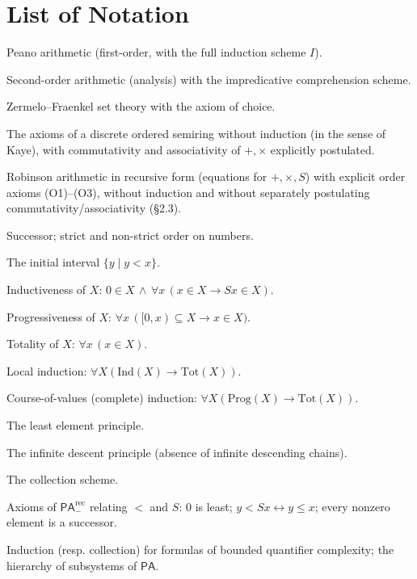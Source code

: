 \documentclass[12pt,a4paper]{article}
\theoremstyle{plain}
\theoremstyle{definition}
\newcommand{\toinf}{\rightarrow}
\newcommand{\PA}{\textsf{PA}}
\newcommand{\Ztwo}{\textsf{Z}_2}
\newcommand{\ZFC}{\textsf{ZFC}}
\newcommand{\PArec}{\PA^{\mathrm{rec}}_{-}}
\begin{document}
\section*{List of Notation}
\begin{description}[leftmargin=3.2cm, style=nextline, font=\normalfont]
    \item[$\PA$] Peano arithmetic (first-order, with the full induction scheme $I$).
    \item[$\Ztwo$] Second-order arithmetic (analysis) with the impredicative comprehension scheme.
    \item[$\ZFC$] Zermelo--Fraenkel set theory with the axiom of choice.
    \item[$\PA^-$] The axioms of a discrete ordered semiring without induction (in the sense of Kaye), with commutativity and associativity of $+,\times$ explicitly postulated.
    \item[$\PArec$] Robinson arithmetic in recursive form (equations for $+,\times,S$) with explicit order axioms (O1)--(O3), without induction and without separately postulating commutativity/associativity (§2.3).
    \item[$S$, $<$, $\leqslant$] Successor; strict and non-strict order on numbers.
    \item[$[0,x)$] The initial interval $\{y \mid y<x\}$.
    \item[$\mathrm{Ind}(X)$] Inductiveness of $X$: $0\in X\,\land\,\forall x\,(x\in X\toinf Sx\in X)$.
    \item[$\mathrm{Prog}(X)$] Progressiveness of $X$: $\forall x\,([0,x)\subseteq X\toinf x\in X)$.
    \item[$\mathrm{Tot}(X)$] Totality of $X$: $\forall x\,(x\in X)$.
    \item[$I$] Local induction: $\forall X(\mathrm{Ind}(X)\toinf\mathrm{Tot}(X))$.
    \item[$I^*$] Course-of-values (complete) induction: $\forall X(\mathrm{Prog}(X)\toinf\mathrm{Tot}(X))$.
    \item[$L$] The least element principle.
    \item[$D$] The infinite descent principle (absence of infinite descending chains).
    \item[$B$] The collection scheme.
    \item[(O1)--(O3)] Axioms of $\PArec$ relating $<$ and $S$: $0$ is least; $y<Sx\leftrightarrow y\leqslant x$; every nonzero element is a successor.
    \item[$I\Sigma_n$, $B\Sigma_n$, $I\Delta_0$] Induction (resp. collection) for formulas of bounded quantifier complexity; the hierarchy of subsystems of $\PA$.

\end{description}
\end{document}
